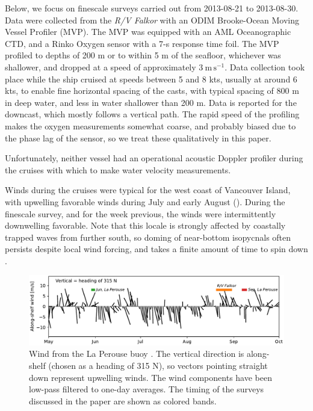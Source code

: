 \documentclass[draft]{agujournal2019}
\begin{document}
Below, we focus on finescale surveys carried out from 2013-08-21 to 2013-08-30.  Data were collected from the \emph{R/V Falkor} with an ODIM Brooke-Ocean Moving Vessel Profiler (MVP).  The MVP was equipped with an AML Oceanographic CTD, and a Rinko Oxygen sensor with a 7-s response time foil.  The MVP profiled to depths of 200 m or to within 5 m of the seafloor, whichever was shallower, and dropped at a speed of approximately $3\ \mathrm{m\,s^{-1}}$.  Data collection took place while the ship cruised at speeds between 5 and 8 kts, usually at around 6 kts, to enable fine horizontal spacing of the casts, with typical spacing  of 800 m in deep water, and less in water shallower than 200 m.  Data is reported for the downcast, which mostly follows a vertical path.  The rapid speed of the profiling makes the oxygen measurements somewhat coarse, and probably biased due to the phase lag of the sensor, so we treat these qualitatively in this paper.

Unfortunately, neither vessel had an operational acoustic Doppler profiler during the cruises with which to make water velocity measurements.

Winds during the cruises were typical for the west coast of Vancouver Island, with upwelling favorable winds during July and early August ().  During the finescale survey, and for the week previous, the winds were intermittently downwelling favorable.  Note that this locale is strongly affected by coastally trapped waves from further south, so doming of near-bottom isopycnals often persists despite local wind forcing, and takes a finite amount of time to spin down \cite{thomsonkrassovski15, engidaetal16}.

\begin{figure}[htbp]
  \begin{center}
    \includegraphics[width=5.5in]{LaPeWind}
    \caption{
      Wind from the La Perouse buoy \cite{DFOWind2013C46206}.  The vertical direction is along-shelf (chosen as a heading of 315 N), so vectors pointing straight down represent upwelling winds.  The wind components have been low-pass filtered to one-day averages.  The timing of the surveys discussed in the paper are shown as colored bands.
      \label{fig:LaPeWind} }
  \end{center}
\end{figure}
\end{document}
